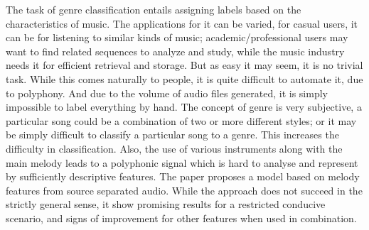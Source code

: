 \documentclass[12pt,journal,compsoc]{IEEEtran}
\begin{document}
% 
% 
% 
% 
The task of genre classification entails assigning labels based on the characteristics of music. The applications for it can be varied, for casual users, it can be for listening to similar kinds of music; academic/professional users may want to find related sequences to analyze and study, while the music industry needs it for efficient retrieval and storage. But as easy it may seem, it is no trivial task. While this comes naturally to people, it is quite difficult to automate it, due to polyphony. And due to the volume of audio files generated, it is simply impossible to label everything by hand. The concept of genre is very subjective, a particular song could be a combination of two or more different styles; or it may be simply difficult to classify a particular song to a genre. This increases the difficulty in classification. Also, the use of various instruments along with the main melody leads to a polyphonic signal which is hard to analyse and represent by sufficiently descriptive features. The paper proposes a model based on melody features from source separated audio. While the approach does not succeed in the strictly general sense, it show promising results for a restricted conducive scenario, and signs of improvement for other features when used in combination.




%
%
\end{document}

